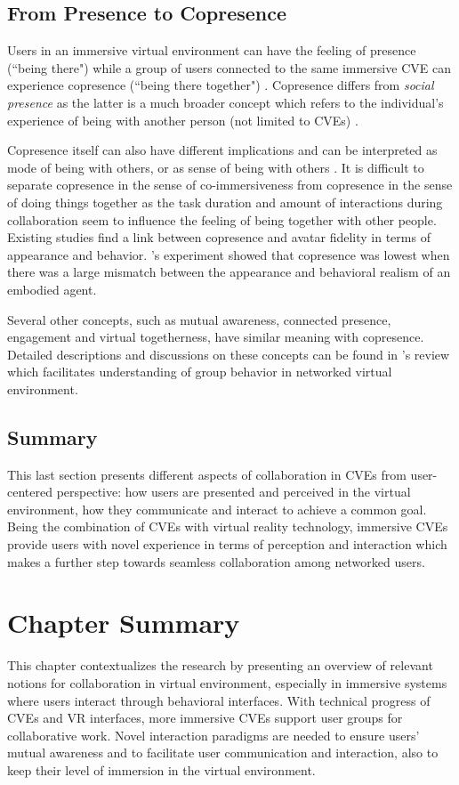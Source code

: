 \subsection{From Presence to Copresence}
Users in an immersive virtual environment can have the feeling of presence (``being there") while a group of users connected to the same immersive CVE can experience copresence (``being there together") \citep{Slater2000Small}. Copresence differs from \textit{social presence} as the latter is a much broader concept which refers to the individual's experience of being with another person (not limited to CVEs) \citep{Schroeder2002Copresence}.

Copresence itself can also have different implications and can be interpreted as mode of being with others, or as sense of being with others \citep{Zhao2003Taxonomy}. It is difficult to separate copresence in the sense of co-immersiveness from copresence in the sense of doing things together \citep{Schroeder2002Copresence} as the task duration and amount of interactions during collaboration seem to influence the feeling of being together with other people. Existing studies \citep{Slater2002Meeting, Garau2003Thesis} find a link between copresence and avatar fidelity in terms of appearance and behavior. \citet{Bailenson2005Copresence}'s experiment showed that copresence was lowest when there was a large mismatch between the appearance and behavioral realism of an embodied agent.

Several other concepts, such as mutual awareness, connected presence, engagement and virtual togetherness, have similar meaning with copresence. Detailed descriptions and discussions on these concepts can be found in \citet{Schroeder2006Being}'s review which facilitates understanding of group behavior in networked virtual environment. 


\subsection{Summary}
This last section presents different aspects of collaboration in CVEs from user-centered perspective: how users are presented and perceived in the virtual environment, how they communicate and interact to achieve a common goal. Being the combination of CVEs with virtual reality technology, immersive CVEs provide users with novel experience in terms of perception and interaction which makes a further step towards seamless collaboration among networked users. 


\section{Chapter Summary}
This chapter contextualizes the research by presenting an overview of relevant notions for collaboration in virtual environment, especially in immersive systems where users interact through behavioral interfaces. With technical progress of CVEs and VR interfaces, more immersive CVEs support user groups for collaborative work. Novel interaction paradigms are needed to ensure users' mutual awareness and to facilitate user communication and interaction, also to keep their level of immersion in the virtual environment. 

